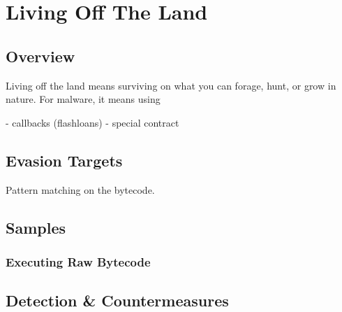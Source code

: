 \section{Living Off The Land} \label{sec:living-off-the-land}

\subsection{Overview}

Living off the land means surviving on what you can forage, hunt, or grow in nature.
For malware, it means using 

- callbacks (flashloans)
- special contract

\subsection{Evasion Targets}

Pattern matching on the bytecode.

\subsection{Samples}

\subsubsection{Executing Raw Bytecode}

\subsection{Detection \& Countermeasures}
